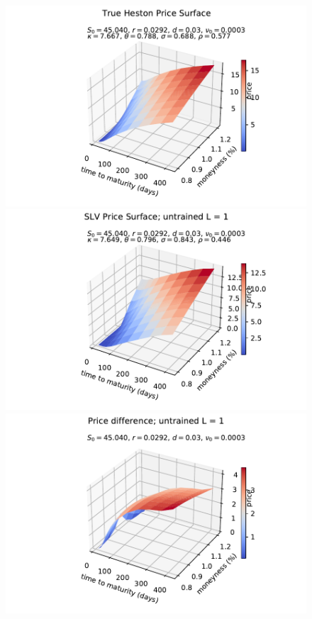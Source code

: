 \documentclass[
a4paper,     %
12pt           %
]{scrartcl}  %
\numberwithin{equation}{section}
\begin{document}
\begin{figure}
\begin{minipage}[Ausrichtung]{0.329\textwidth}
	\end{minipage}
	\begin{minipage}[Ausrichtung]{0.329\textwidth}
		\includegraphics[width=\textwidth]{fig/Psurf_orginal_2017-01-02}
	\end{minipage}
	\begin{minipage}[Ausrichtung]{0.329\textwidth}
		\includegraphics[width=\textwidth]{fig/Psurf_untrained_2017-01-02}
	\end{minipage}
	\begin{minipage}[Ausrichtung]{0.329\textwidth}
		\includegraphics[width=\textwidth]{fig/Psurf_untrained_diff_2017-01-02_rec_3lay_seed1}

\end{minipage}
\end{figure}
\end{document}
